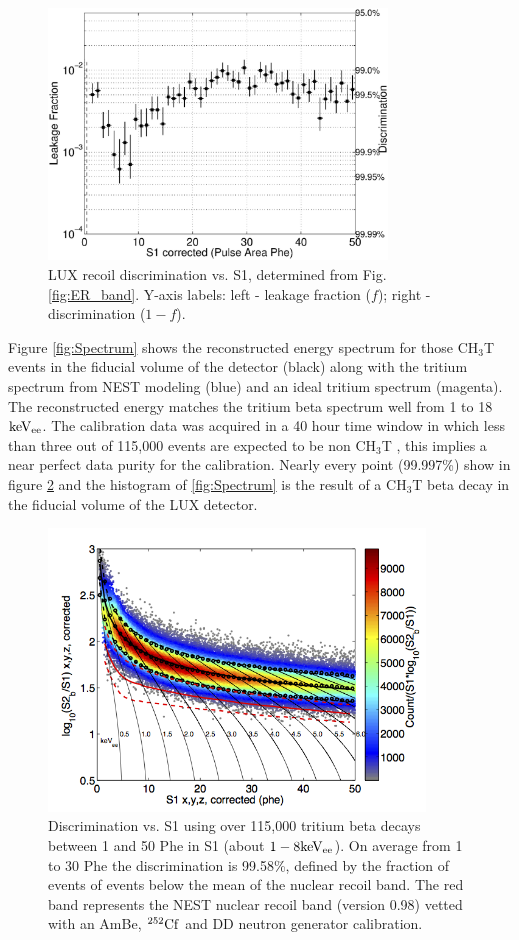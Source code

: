 \begin{figure}[h!]\centering
\includegraphics[width=90mm]{fig/CH3T_Leakage_fid_50_Dec_Tritium_Approval_Plots_2.eps}
\caption{LUX recoil discrimination vs. S1, determined from Fig. \ref{fig:ER_band}. Y-axis labels: left -  leakage fraction ($f$); right - discrimination ($1-f$).}
\label{fig:Leak}
\end{figure}


Figure \ref{fig:Spectrum} shows the reconstructed energy spectrum for those CH$_3$T events in the fiducial volume of the detector (black) along with the tritium spectrum from NEST modeling (blue) and an ideal tritium spectrum (magenta). The reconstructed energy matches the tritium beta spectrum well from 1 to 18 $\rm keV_{ee}$.
The calibration data was acquired in a 40 hour time window in which less than three out of 115,000 events are expected to be non CH$_3$T \cite{LUX_BG}, this implies a near perfect data purity for the calibration. Nearly every point (99.997\%) show in figure \ref{fig:Band} and the histogram of \ref{fig:Spectrum} is the result of a CH$_3$T beta decay in the fiducial volume of the LUX detector.

\begin{figure}[h!]\centering
\includegraphics[width=100mm]{fig/CH3T_fid_50_2_Dec_Tritium_Approval_Plots.png}
\caption{Discrimination vs. S1 using over 115,000 tritium beta decays between 1 and 50 Phe in S1 (about $\rm1-8 keV_{ee}$). On average from 1 to 30 Phe the discrimination is 99.58\%, defined by the fraction of events of events below the mean of the nuclear recoil band. The red band represents the NEST nuclear recoil band (version 0.98) vetted with an AmBe, $\rm^{252}Cf$ and DD neutron generator calibration.}
\label{fig:Band}
\end{figure}


